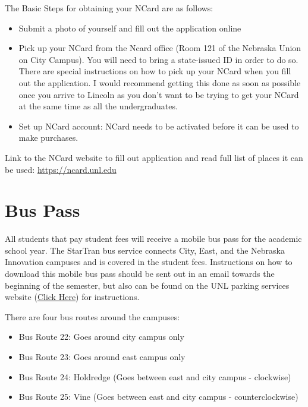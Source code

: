 \documentclass[
  12pt,
]{book}
\providecommand{\tightlist}{%
  \setlength{\itemsep}{0pt}\setlength{\parskip}{0pt}}
\begin{document}
The Basic Steps for obtaining your NCard are as follows:

\begin{itemize}
\tightlist
\item
  Submit a photo of yourself and fill out the application online
\item
  Pick up your NCard from the Ncard office (Room 121 of the Nebraska Union on City Campus). You will need to bring a state-issued ID in order to do so. There are special instructions on how to pick up your NCard when you fill out the application. I would recommend getting this done as soon as possible once you arrive to Lincoln as you don't want to be trying to get your NCard at the same time as all the undergraduates.
\item
  Set up NCard account: NCard needs to be activated before it can be used to make purchases.
\end{itemize}

Link to the NCard website to fill out application and read full list of places it can be used: \url{https://ncard.unl.edu}

\hypertarget{bus-pass}{%
\section{Bus Pass}\label{bus-pass}}

All students that pay student fees will receive a mobile bus pass for the academic school year. The StarTran bus service connects City, East, and the Nebraska Innovation campuses and is covered in the student fees. Instructions on how to download this mobile bus pass should be sent out in an email towards the beginning of the semester, but also can be found on the UNL parking services website (\href{https://parking.unl.edu/bus-riders-user-guide#student-pass}{Click Here}) for instructions.

There are four bus routes around the campuses:

\begin{itemize}
\tightlist
\item
  Bus Route 22: Goes around city campus only
\item
  Bus Route 23: Goes around east campus only
\item
  Bus Route 24: Holdredge (Goes between east and city campus - clockwise)
\item
  Bus Route 25: Vine (Goes between east and city campus - counterclockwise)
\end{itemize}
\end{document}
